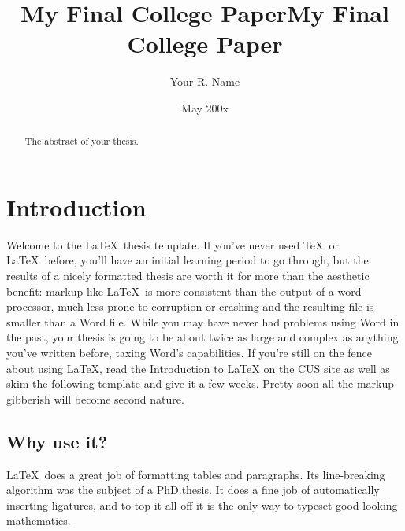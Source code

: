 \documentclass[12pt,twoside]{reedthesis}
\title{My Final College Paper}
\author{Your R. Name}
\date{May 200x}
\title{My Final College Paper}
\begin{document}
\maketitle

  \frontmatter %
  \pagestyle{empty} %

\begin{abstract}
The abstract of your thesis.
\end{abstract}






%

\chapter*{Introduction}

Welcome to the \LaTeX~thesis template. If you've never used \TeX~or
\LaTeX~before, you'll have an initial learning period to go through, but
the results of a nicely formatted thesis are worth it for more than the
aesthetic benefit: markup like \LaTeX~is more consistent than the output
of a word processor, much less prone to corruption or crashing and the
resulting file is smaller than a Word file. While you may have never had
problems using Word in the past, your thesis is going to be about twice
as large and complex as anything you've written before, taxing Word's
capabilities. If you're still on the fence about using \LaTeX, read the
Introduction to LaTeX on the CUS site as well as skim the following
template and give it a few weeks. Pretty soon all the markup gibberish
will become second nature.

\section{Why use it?}

\LaTeX~does a great job of formatting tables and paragraphs. Its
line-breaking algorithm was the subject of a PhD.\thinspace thesis. It
does a fine job of automatically inserting ligatures, and to top it all
off it is the only way to typeset good-looking mathematics.
\end{document}
